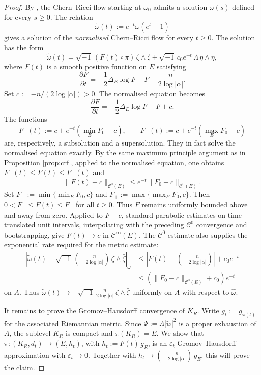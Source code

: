 \documentclass[12pt]{amsart}
\numberwithin{equation}{section}
\theoremstyle{remark}
\theoremstyle{definition}
\begin{document}
\begin{proof}
By , the Chern--Ricci flow starting at $\omega_0$ admits a solution $\omega(s)$ defined for every $s\geq 0$. The relation
$$ \tilde\omega(t):=e^{-t}\omega(e^t-1) $$
gives a solution of the \emph{normalised} Chern--Ricci flow for every $t\geq 0$.
The solution has the form
$$ \tilde\omega(t) = \sqrt{-1}\,( F(t) \circ \pi) \, \zeta\wedge\bar\zeta + \sqrt{-1}\, c_0e^{-t}\, \Lambda\, \eta\wedge\bar\eta, $$
where $F(t)$ is a smooth positive function on $E$ satisfying
$$ \frac{\partial F}{\partial t} = - \frac{1}{2} \Delta_E \log F - F - \frac{n}{2\log|\alpha|}. $$
Set $c:=-n/(2\log|\alpha|)>0$. The normalised equation becomes
$$\frac{\partial F}{\partial t}=-\frac12\Delta_E\log F-F+c.$$
The functions
$$F_-(t):=c+e^{-t}(\min_E F_0-c),\qquad F_+(t):=c+e^{-t}(\max_E F_0-c)$$
are, respectively, a subsolution and a supersolution.
They in fact solve the normalised equation exactly.
By the same maximum principle argument as in Proposition \ref{prop:crf}, applied to the normalised equation, one obtains $F_-(t)\leq F(t)\leq F_+(t)$ and
$$\|F(t)-c\|_{\mathcal C^0(E)}\leq e^{-t}\|F_0-c\|_{\mathcal C^0(E)}.$$
Set $F_-:=\min\{\min_E F_0,c\}$ and $F_+:=\max\{\max_E F_0,c\}$. Then $0<F_-\leq F(t)\leq F_+$ for all $t\geq0$. Thus $F$ remains uniformly bounded above and away from zero. Applied to $F-c$, standard parabolic estimates on time-translated unit intervals,  interpolating with the preceding $\mathcal C^0$ convergence and bootstrapping, give $F(t)\to c$ in $\mathcal C^\infty(E)$. The $\mathcal C^0$ estimate also supplies the exponential rate required for the metric estimate:
\begin{align*}
\left| \tilde\omega(t) - \sqrt{-1}\, \left(-\frac{n}{2\log|\alpha|}\right)\, \zeta\wedge\bar\zeta \right|_{\hat\omega}
&\leq \left| F(t) - \left(-\frac{n}{2\log|\alpha|}\right) \right| + c_0 e^{-t} \\
&\leq (\|F_0-c\|_{\mathcal C^0(E)}+c_0)e^{-t}
\end{align*}
on $A$. Thus $\tilde\omega(t) \to -\sqrt{-1}\,\frac{n}{2\log|\alpha|}\, \zeta\wedge\bar\zeta$ uniformly on $A$ with respect to $\hat\omega$.

It remains to prove the Gromov--Hausdorff convergence of $K_R$. Write $g_t:=g_{\tilde\omega(t)}$ for the associated Riemannian metric. Since $\Psi:=\Lambda|\tilde w|^2$ is a proper exhaustion of $A$, the sublevel $K_R$ is compact and $\pi(K_R)=E$.
We show that $\pi\colon(K_R,d_t)\to(E,h_t)$, with $h_t:=F(t)\,g_E$, is an $\varepsilon_t$-Gromov--Hausdorff
approximation with $\varepsilon_t\to0$. Together with $h_t\to (-\frac{n}{2\log|\alpha|})\,g_E$, this will prove the claim.


\end{proof}
\end{document}
